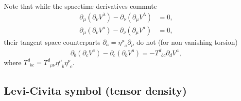 \documentclass[
10pt, %
a4paper, %
oneside, %
twocolumn,
headinclude,footinclude, %
BCOR5mm, %
]{scrartcl}
\newcommand{\itetrsymbol}{\eta}
\newcommand{\itetr}[2]{\itetrsymbol^{#1}_{\phantom{#1}#2}}
\newcommand{\rtetr}[2]{h^{#1}_{\mathsmaller{(r)} #2}}
\newcommand{\spin}[2]{\omega^{#1}_{\phantom{#1}#2}}
\newcommand{\D}[1]{\partial_{#1}} %
\newcommand{\Tors}[2]{T^{#1}_{\phantom{#1}#2}}
\begin{document}
	Note that while the spacetime derivatives commute
	\begin{align}\label{eqn.commut.D}
		\D{\mu}(\D{\nu} V^\lambda) - \D{\nu}(\D{\mu} V^\lambda) &= 0, 
		\\[2mm] 
		\D{\mu}(\D{\nu} V^a) - \D{\nu}(\D{\mu} V^a) &= 0,
	\end{align}
	their tangent space counterparts $\D{a} =  \itetr{\mu}{a}\D{\mu}$ do not (for non-vanishing 
	torsion)
	\begin{equation}
		\D{b}(\D{c} V^a) - \D{c}(\D{b} V^a) = 
		-\Tors{d}{b c}\D{d}V^a,
	\end{equation}
	where $  \Tors{d}{bc} = \Tors{d}{\mu\nu}\itetr{\mu}{b}\itetr{\nu}{c} $.
	
	
	
	\subsection{Levi-Civita symbol (tensor density)}
	
	
\end{document}
